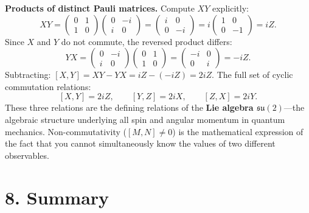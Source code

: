 \documentclass[12pt,a4paper]{article}
\begin{document}
\medskip
\noindent\textbf{Products of distinct Pauli matrices.}  Compute $XY$ explicitly:
\[
    XY = \begin{pmatrix}0&1\\1&0\end{pmatrix}\begin{pmatrix}0&-i\\i&0\end{pmatrix}
    = \begin{pmatrix}i&0\\0&-i\end{pmatrix}
    = i\begin{pmatrix}1&0\\0&-1\end{pmatrix}
    = iZ.
\]
Since $X$ and $Y$ do not commute, the reversed product differs:
\[
    YX = \begin{pmatrix}0&-i\\i&0\end{pmatrix}\begin{pmatrix}0&1\\1&0\end{pmatrix}
    = \begin{pmatrix}-i&0\\0&i\end{pmatrix}
    = -iZ.
\]
Subtracting: $[X,Y] = XY - YX = iZ - (-iZ) = 2iZ$.  The full set of cyclic commutation relations:
\[
    \boxed{[X,Y] = 2iZ, \qquad [Y,Z] = 2iX, \qquad [Z,X] = 2iY.}
\]
These three relations are the defining relations of the \textbf{Lie algebra $\mathfrak{su}(2)$}---the algebraic structure underlying all spin and angular momentum in quantum mechanics.  Non-commutativity ($[M,N]\neq 0$) is the mathematical expression of the fact that you cannot simultaneously know the values of two different observables.

\section{8. Summary}
\end{document}
